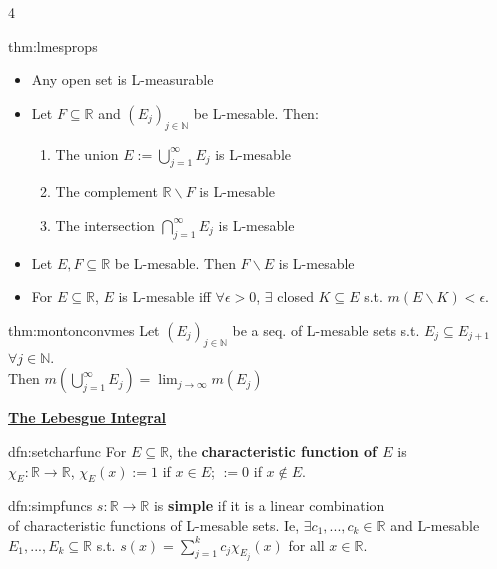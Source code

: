 \documentclass[landscape, 8pt]{extarticle}
\begin{document}
\begin{multicols*}{4}
		
		\begin{thm}{thm:lmesprops}{ }
			\begin{itemize}
				\item Any open set is L-measurable
				\item Let $F \subseteq \mathbb{R}$ and $(E_j)_{j\in \mathbb{N}}$ be L-mesable. Then:
					\begin{enumerate}[label=(\arabic*)]
						\item The union $E := \bigcup_{j=1}^\infty E_j$ is L-mesable
						\item The complement $\mathbb{R} \backslash F$ is L-mesable
						\item The intersection $\bigcap_{j=1}^\infty E_j$ is L-mesable
					\end{enumerate}
				\item Let $E, F \subseteq \mathbb{R}$ be L-mesable. Then $F \backslash E$ is L-mesable
				\item For $E \subseteq \mathbb{R}$, $E$ is L-mesable iff $\forall \epsilon > 0$, $\exists$ closed $K \subseteq E$ s.t. $m(E \backslash K) <\epsilon$.
			\end{itemize}
			
		\end{thm}
		
		
		\begin{thm}{thm:montonconvmes}{ }
			Let $(E_j)_{j\in \mathbb{N}}$ be a seq. of L-mesable sets s.t. $E_j \subseteq E_{j+1}$ $\forall j\in \mathbb{N}$. \\
			Then $m\left(\bigcup_{j=1}^\infty E_j\right) = \lim_{j\to \infty}m(E_j)$
			
		\end{thm}
		
		
		
	{\tiny\textbf{\underline{The Lebesgue Integral}}}
		
		
		
		\begin{dfn}{dfn:setcharfunc}{ }
			For $E \subseteq \mathbb{R}$, the \textbf{characteristic function of $E$} is \\
			$\chi_E: \mathbb{R}\to \mathbb{R}$, $\chi_E(x) := 1$ if $x\in E$; $:= 0$ if $x \notin E$.
			
		\end{dfn}
		
		
		\begin{dfn}{dfn:simpfuncs}{ }
			$s: \mathbb{R} \to \mathbb{R}$ is \textbf{simple} if it is a linear combination \\
			of characteristic functions of L-mesable sets. Ie, $\exists c_1, ..., c_k\in \mathbb{R}$ and L-mesable $E_1, ..., E_k \subseteq \mathbb{R}$ s.t. $s(x) = \sum_{j=1}^{k}c_j \chi_{E_j}(x)$ for all $x\in \mathbb{R}$.
			

\end{dfn}
\end{multicols*}
\end{document}
